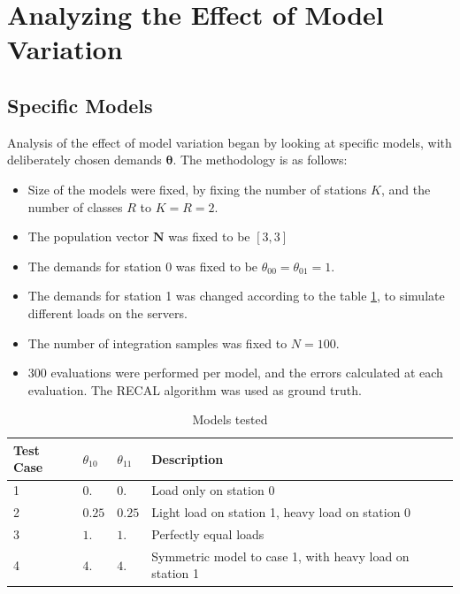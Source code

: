 \section{Analyzing the Effect of Model Variation}\label{sec:analyze_model_variation}

\subsection{Specific Models}\label{sec:experiments_specific_models}

Analysis of the effect of model variation began by looking at specific models, with deliberately chosen demands \(\boldsymbol{\theta}\). The methodology is as follows: 
\begin{itemize}[noitemsep]
    \item Size of the models were fixed, by fixing the number of stations \(K\), and the number of classes \(R\) to \(K=R=2\).
    \item The population vector \(\mathbf{N}\) was fixed to be \([3,3]\)
    \item The demands for station 0 was fixed to be \(\theta_{00} = \theta_{01} = 1.\)
    \item The demands for station 1 was changed according to the table \ref{tab:specific_models_evaluate}, to simulate different loads on the servers.
    \item The number of integration samples was fixed to \(N=100\).
    \item 300 evaluations were performed per model, and the errors calculated at each evaluation. The RECAL algorithm was used as ground truth.
\end{itemize}

\begin{table}[H]
\begin{center}
\begin{tabular}{@{}lllll@{}}
\toprule
 Test Case &  \(\theta_{10}\) & \(\theta_{11}\) & Description \\ \midrule
 1 & \(0.\) & \(0.\) & Load only on station 0 \\
 2 & \(0.25\) & \(0.25\) & Light load on station 1, heavy load on station 0\\
 3 & \(1.\) & \(1.\) & Perfectly equal loads \\
 4 & \(4.\) & \(4.\) & Symmetric model to case 1, with heavy load on station 1 \\ \bottomrule
\end{tabular}
\end{center}
\caption{Models tested}
\label{tab:specific_models_evaluate}
\end{table} 

